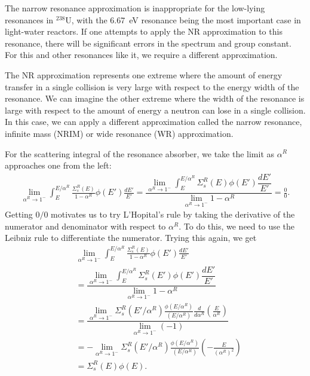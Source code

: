 The narrow resonance approximation is inappropriate for the low-lying resonances in $^{238}$U, with the 6.67~eV resonance being the most important case in light-water reactors. If one attempts to apply the NR approximation to this resonance, there will be significant errors in the spectrum and group constant. For this and other resonances like it, we require a different approximation.

The NR approximation represents one extreme where the amount of energy transfer in a single collision is very large with respect to the energy width of the resonance. We can imagine the other extreme where the width of the resonance is large with respect to the amount of energy a neutron can lose in a single collision. In this case, we can apply a different approximation called the narrow resonance, infinite mass (NRIM) or wide resonance (WR) approximation.

For the scattering integral of the resonance absorber, we take the limit as $\alpha^R$ approaches one from the left:
\begin{align}
  \lim_{\alpha^R \rightarrow 1^-} \int_E^{E/\alpha^R} \frac{\Sigma_s^R(E)}{ 1 - \alpha^R } \phi(E') \frac{dE'}{E'} 
  = \dfrac{ \displaystyle\lim_{\alpha^R \rightarrow 1^-} \int_E^{E/\alpha^R} \Sigma_s^R(E) \phi(E') \dfrac{dE'}{E'} }{ \displaystyle\lim_{\alpha^R \rightarrow 1^-} 1 - \alpha^R } = \frac{0}{0} . \nonumber
\end{align}
Getting $0/0$ motivates us to try L'Hopital's rule by taking the derivative of the numerator and denominator with respect to $\alpha^R$. To do this, we need to use the Leibniz rule to differentiate the numerator. Trying this again, we get
\begin{align}
  &\lim_{\alpha^R \rightarrow 1^-} \int_E^{E/\alpha^R} \frac{\Sigma_s^R(E)}{ 1 - \alpha^R } \phi(E') \frac{dE'}{E'} \nonumber \\
  &= \dfrac{ \displaystyle\lim_{\alpha^R \rightarrow 1^-} \int_E^{E/\alpha^R} \Sigma_s^R(E') \phi(E') \dfrac{dE'}{E'} }{ \displaystyle\lim_{\alpha^R \rightarrow 1^-} 1 - \alpha^R }  \nonumber \\
  &= \dfrac{ \displaystyle\lim_{\alpha^R \rightarrow 1^-}  \Sigma_s^R(E'/\alpha^R) \frac{\phi(E/\alpha^R)}{(E/\alpha^R)} \frac{d}{d\alpha^R} \left( \frac{E}{\alpha^R} \right)  }{ \displaystyle\lim_{\alpha^R \rightarrow 1^-} (-1) } \nonumber \\
  &= - \displaystyle\lim_{\alpha^R \rightarrow 1^-}  \Sigma_s^R(E'/\alpha^R) \frac{\phi(E/\alpha^R)}{(E/\alpha^R)} \left( -\frac{E}{( \alpha^R )^2} \right) \nonumber \\
  &= \Sigma_s^R(E) \phi(E) .
\end{align}

